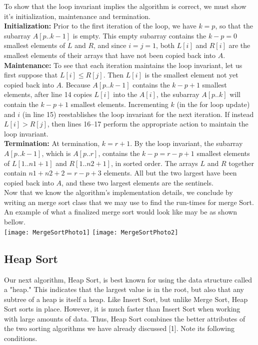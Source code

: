 \documentclass[12pt]{article}
\begin{document}
To show that the loop invariant implies the algorithm is correct, we must show it's initialization, maintenance and termination. \\

\textbf{Initialization:} Prior to the first iteration of the loop, we have $k=p$, so that the subarray $A[p..k-1]$ is empty. This empty subarray contains the $k-p=0$ smallest elements of $L$ and $R$, and since $i=j=1$, both $L[i]$ and $R[i]$ are the smallest elements of their arrays that have not been copied back into $A$. \\

\textbf{Maintenance:} To see that each iteration maintains the loop invariant, let us first suppose that $L[i] \le R[j]$. Then $L[i]$ is the smallest element not yet copied back into $A$. Because $A[p..k-1]$ contains the $k-p+1$ smallest elements, after line 14 copies $L[i]$ into the $A[i]$, the subarray $A[p..k]$ will contain the $k-p+1$ smallest elements. Incrementing $k$ (in the for loop update) and $i$ (in line 15) reestablishes the loop invariant for the next iteration. If instead  $L[i] > R[j]$, then lines 16–17 perform the appropriate action to maintain the loop invariant.\\

\textbf{Termination:} At termination, $k=r+1$. By the loop invariant, the subarray $A[p..k-1]$, which is $A[p..r]$, contains the $k-p=r-p+1$ smallest
elements of $L[1..n1+1]$ and $R[1..n2+1]$, in sorted order. The arrays $L$
and $R$ together contain $n1+n2 +2 = r-p+3$ elements. All but the two
largest have been copied back into $A$, and these two largest elements are the sentinels. \\

Now that we know the algorithm's implementation details, we conclude by writing an merge sort class that we may use to find the run-times for merge Sort. An example of what a finalized merge sort would look like may be as shown bellow.\\

\texttt{[image: MergeSortPhoto1]}
\texttt{[image: MergeSortPhoto2]}



\subsection*{Heap Sort}
Our next algorithm, Heap Sort, is best known for using the data structure called a "heap." This indicates that the largest value is in the root, but also that any subtree of a heap is itself a heap. Like Insert Sort, but unlike Merge Sort, Heap Sort sorts in place. However, it is much faster than Insert Sort when working with large amounts of data. Thus, Heap Sort combines the better attributes of the two sorting algorithms we have already discussed [1]. Note its following conditions.\\
\end{document}
